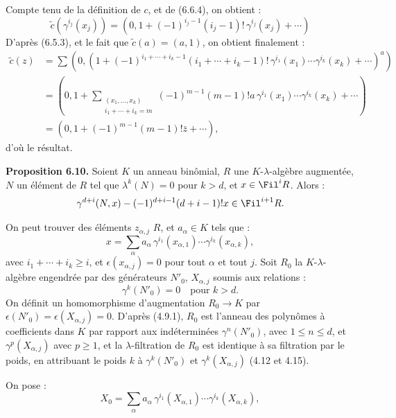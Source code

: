 Compte tenu de la définition de \(c\), et de (6.6.4), on obtient :
\[
  \widetilde c(\gamma^{i_j}(x_j))
  =
  \left(0,1+(-1)^{i_j-1}(i_j-1)!\,\gamma^{i_j}(x_j)+\cdots\right)
\]
D'après (6.5.3), et le fait que \(\widetilde c(a)=(a,1)\), on obtient finalement :
\[
\begin{aligned}
\widetilde c(z)
&=\sum
\left(0,\left(1+
(-1)^{i_1+\cdots+i_k-1}
(i_1+\cdots+i_k-1)!
\,\gamma^{i_1}(x_1)\cdots\gamma^{i_k}(x_k)
+\cdots\right)^a\right)\\
&=
\left(0,1+
\sum_{\substack{(x_1,\ldots,x_k)\\ i_1+\cdots+i_k=m}}
(-1)^{m-1}(m-1)!a\,\gamma^{i_1}(x_1)\cdots\gamma^{i_k}(x_k)
+\cdots\right)\\
&=
(0,1+(-1)^{m-1}(m-1)!\bar z+\cdots),
\end{aligned}
\]
d'où le résultat.

\textbf{Proposition 6.10.} Soient \(K\) un anneau binômial, \(R\) une \(K\)-\(\lambda\)-algèbre augmentée, \(N\) un élément de \(R\) tel que \(\lambda^k(N)=0\) pour \(k>d\), et \(x\in\Fil^iR\). Alors :
\[
  \gamma^{d+i}(N,x)-(-1)^{d+i-1}(d+i-1)!x\in\Fil^{i+1}R.
\]

On peut trouver des éléments \(z_{\alpha,j}\) \(R\), et \(a_\alpha\in K\) tels que :
\[
  x=\sum_\alpha a_\alpha\,
       \gamma^{i_1}(x_{\alpha,1})\cdots
       \gamma^{i_k}(x_{\alpha,k}),
\]
avec \(i_1+\cdots+i_k\ge i\), et \(\epsilon(x_{\alpha,j})=0\) pour tout \(\alpha\) et tout \(j\). Soit \(R_0\) la \(K\)-\(\lambda\)-algèbre engendrée par des générateurs \(N'_0\), \(X_{\alpha,j}\) soumis aux relations :
\[
  \gamma^k(N'_0)=0\quad\text{pour }k>d.
\]
On définit un homomorphisme d'augmentation \(R_0\to K\) par \(\epsilon(N'_0)=\epsilon(X_{\alpha,j})=0\). D'après (4.9.1), \(R_0\) est l'anneau des polynômes à coefficients dans \(K\) par rapport aux indéterminées \(\gamma^n(N'_0)\), avec \(1\le n\le d\), et \(\gamma^p(X_{\alpha,j})\) avec \(p\ge1\), et la \(\lambda\)-filtration de \(R_0\) est identique à sa filtration par le poids, en attribuant le poids \(k\) à \(\gamma^k(N'_0)\) et \(\gamma^k(X_{\alpha,j})\) (4.12 et 4.15).

On pose :
\[
  X_0=\sum_\alpha a_\alpha\,
       \gamma^{i_1}(X_{\alpha,1})\cdots
       \gamma^{i_k}(X_{\alpha,k}),
\]
